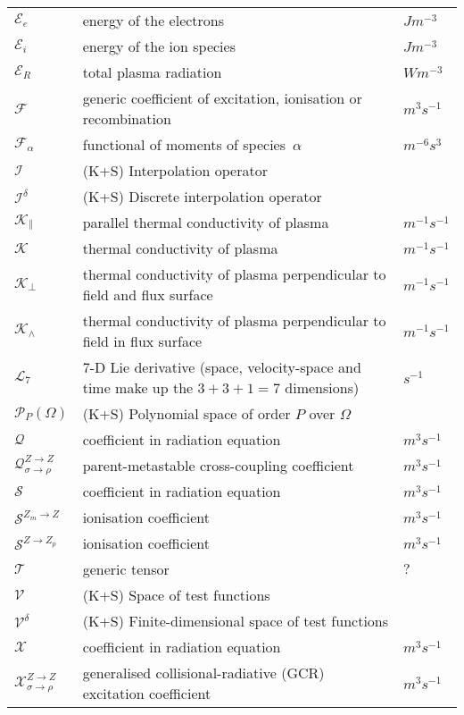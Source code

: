 \begin{longtable}{|p{3.0cm}|p{10.0cm}|p{3.0cm}|}
$\mathcal{E}_e$ & energy of the electrons & $J m^{-3}$ \\
$\mathcal{E}_i$ & energy of the ion species & $J m^{-3}$ \\
$\mathcal{E}_R$ & total plasma radiation & $W m^{-3}$ \\
$\mathcal{F}$ & generic coefficient of excitation, ionisation or recombination  & $m^3 s^{-1}$ \\
$\mathcal{F}_\alpha$ & functional of moments of species~$\alpha$  & $m^{-6} s^3$ \\
$\mathcal{I}$ &  (K+S) Interpolation operator & \\
$\mathcal{I}^{\delta}$ &  (K+S) Discrete interpolation operator & \\
$\mathcal{K}_{\|}$ & parallel thermal conductivity of plasma & $m^{-1}s^{-1}$ \\
$\mathcal{K}$ & thermal conductivity of plasma & $m^{-1}s^{-1}$ \\
$\mathcal{K}_{\perp}$ & thermal conductivity of plasma perpendicular to field and flux surface & $m^{-1}s^{-1}$ \\
$\mathcal{K}_{\wedge}$ & thermal conductivity of plasma perpendicular to field in flux surface & $m^{-1}s^{-1}$ \\
$\mathcal{L}_7$ & 7-D Lie derivative (space, velocity-space and time make up the $3+3+1=7$ dimensions)  & $s^{-1}$ \\
$\mathcal{P}_{P}(\Omega)$ &  (K+S) Polynomial space of order $P$ over $\Omega$ & \\
$\mathcal{Q}$ & coefficient in radiation equation  & $m^3 s^{-1}$ \\
$\mathcal{Q}_{\sigma \rightarrow \rho}^{Z\rightarrow Z}$ & parent-metastable cross-coupling coefficient  & $m^3 s^{-1}$ \\
$\mathcal{S}$ & coefficient in radiation equation  & $m^3 s^{-1}$ \\
$\mathcal{S}^{Z_m\rightarrow Z}$ & ionisation coefficient  & $m^3 s^{-1}$ \\
$\mathcal{S}^{Z\rightarrow Z_p}$ & ionisation coefficient  & $m^3 s^{-1}$ \\
$\mathcal{T}$ & generic tensor & $?$ \\
$\mathcal{V}$ &  (K+S) Space of test functions & \\
$\mathcal{V}^{\delta}$ &  (K+S) Finite-dimensional space of test functions & \\
$\mathcal{X}$ & coefficient in radiation equation  & $m^3 s^{-1}$ \\
$\mathcal{X}_{\sigma \rightarrow \rho}^{Z\rightarrow Z}$ & generalised collisional-radiative (GCR) excitation coefficient  & $m^3 s^{-1}$ \\

\end{longtable}
